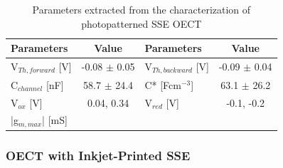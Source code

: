 \begin{table}[ht]
\centering
\caption{Parameters extracted from the characterization of photopatterned SSE OECT}
\begin{tabular}{l|c||l|c}
Parameters & Value & Parameters & Value \\\hline \hline
V$_{Th,forward}$ [V] & -0.08 $\pm$ 0.05 & V$_{Th,backward}$ [V] & -0.09 $\pm$ 0.04\\
C$_{channel}$ [nF] & 58.7 $\pm$ 24.4 & C* [Fcm$^{-3}$] & 63.1 $\pm$ 26.2 \\
V$_{ox}$ [V] & 0.04, 0.34  & V$_{red}$ [V] & -0.1, -0.2 \\
|g$_{m,max}$| [mS] &  &  &\\\hline
\end{tabular}
\label{tab:dropfom}
\end{table}

\subsubsection{OECT with Inkjet-Printed SSE}%



